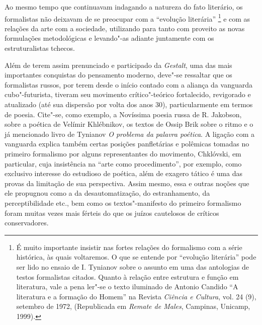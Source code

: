 Ao mesmo tempo que continuavam indagando a natureza do fato literário,
os formalistas não deixavam de se preocupar com a ``evolução literária''
\footnote{É muito importante insistir nas fortes relações do formalismo
  com a série histórica, às quais voltaremos. O que se entende por
  ``evolução literária'' pode ser lido no ensaio de I. Tynianov sobre o
  assunto em uma das antologias de testos formalistas citados. Quanto à
  relação entre estrutura e função em literatura, vale a pena ler"-se o
  texto iluminado de Antonio Candido ``A literatura e a formação do
  Homem'' na Revista \emph{Ciência e Cultura}, vol. 24 (9), setembro de
  1972, (Republicada em \emph{Remate de Males}, Campinas, Unicamp,
  1999).} e com as relações da arte com a sociedade, utilizando para
tanto com proveito as novas formulações metodológicas e levando"-as
adiante juntamente com os estruturalistas tchecos.

Além de terem assim prenunciado e participado da \emph{Gestalt}, uma das
mais importantes conquistas do pensamento moderno, deve"-se ressaltar que
os formalistas russos, por terem desde o início contado com a aliança da
vanguarda cubo"-futurista, tiveram seu movimento crítico"-teórico
fortalecido, revigorado e atualizado (até sua dispersão por volta dos
anos 30), particularmente em termos de poesia. Cite"-se, como exemplo, a
Novíssima poesia russa de R. Jakobson, sobre a poética de Velímir
Khlébnikov, os textos de Ossip Brik sobre o ritmo e o já mencionado
livro de Tynianov \emph{O problema da palavra poética}. A ligação com a
vanguarda explica também certas posições panfletárias e polêmicas
tomadas no primeiro formalismo por alguns representantes do movimento,
Chklóvski, em particular, cuja insistência na ``arte como
procedimento'', por exemplo, como exclusivo interesse do estudioso de
poética, além de exagero tático é uma das provas da limitação de sua
perspectiva. Assim mesmo, essa e outras noções que ele propugnou como a
da desautomatização, do estranhamento, da perceptibilidade etc., bem
como os textos"-manifesto do primeiro formalismo foram muitas vezes mais
férteis do que os juízos cautelosos de críticos conservadores.

